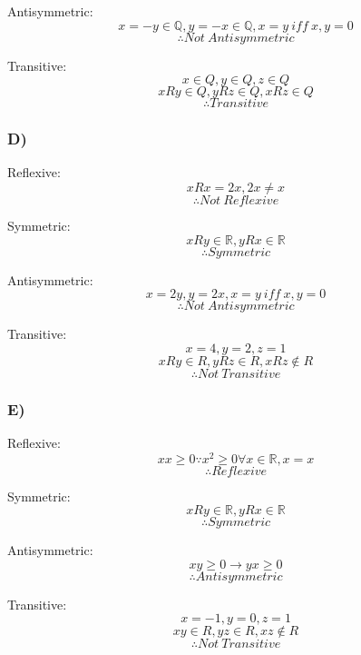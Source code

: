 \documentclass[journal]{IEEEtran}
\begin{document}
Antisymmetric:
$$x = -y \in \mathbb{Q}, y = -x \in \mathbb{Q}, x = y~iff~x,y=0$$
$$\therefore \boxed{Not~Antisymmetric}$$

Transitive:
$$x \in Q, y \in Q, z \in Q$$
$$xRy \in Q,  yRz \in Q, xRz \in Q$$
$$\therefore \boxed{Transitive}$$

\subsubsection*{D)}
Reflexive:
$$xRx = 2x, 2x \neq x$$
$$\therefore \boxed{Not~Reflexive}$$

Symmetric:
$$xRy \in \mathbb{R}, yRx \in \mathbb{R}$$
$$\therefore \boxed{Symmetric}$$

Antisymmetric:
$$x = 2y, y = 2x, x = y~iff~x,y=0$$
$$\therefore \boxed{Not~Antisymmetric}$$

Transitive:
$$x = 4, y = 2, z = 1$$
$$xRy \in R,  yRz \in R, xRz \notin R$$
$$\therefore \boxed{Not~Transitive}$$

\subsubsection*{E)}
Reflexive:
$$xx \ge 0 \because x^2 \ge 0 \forall x \in \mathbb{R}, x = x$$
$$\therefore \boxed{Reflexive}$$

Symmetric:
$$xRy \in \mathbb{R}, yRx \in \mathbb{R}$$
$$\therefore \boxed{Symmetric}$$

Antisymmetric:
$$xy \ge 0 \rightarrow yx \ge 0$$
$$\therefore \boxed{Antisymmetric}$$

Transitive:
$$x = -1, y = 0, z = 1$$
$$xy \in R,  yz \in R, xz \notin R$$
$$\therefore \boxed{Not~Transitive}$$
\end{document}
